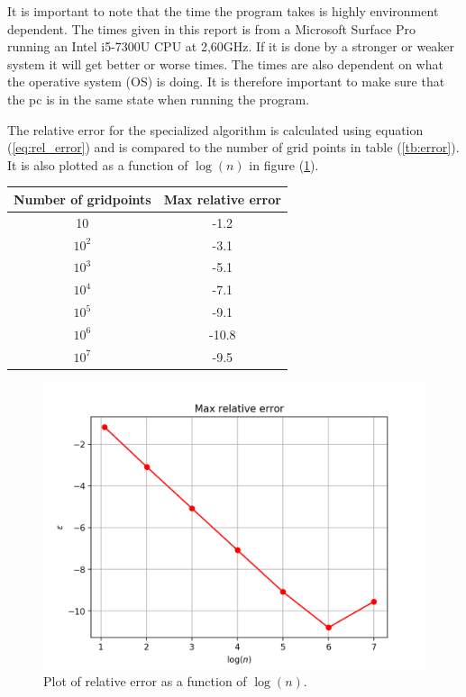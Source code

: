 \documentclass[12pt]{article}
\begin{document}
It is important to note that the time the program takes is highly environment dependent. The times given in this report is from a Microsoft Surface Pro running an Intel i5-7300U CPU at 2,60GHz. If it is done by a stronger or weaker system it will get better or worse times. The times are also dependent on what the operative system (OS) is doing. It is therefore important to make sure that the pc is in the same state when running the program.
\hfill\break

The relative error for the specialized algorithm is calculated using equation (\ref{eq:rel_error}) and is compared to the number of grid points in table (\ref{tb:error}). It is also plotted as a function of $\log{(n)}$ in figure (\ref{fig:rel_error}).


\begin{center}
  \label{tb:error}
  \begin{tabular}{||c|c||}

    \hline\hline Number of gridpoints & Max relative error \\
    \hline
    10 & -1.2 \\
    \hline
    $10^2$ & -3.1 \\
    \hline
    $10^3$ & -5.1 \\ 
    \hline
    $10^4$ & -7.1 \\
    \hline
    $10^5$ & -9.1 \\ 
    \hline
    $10^6$ & -10.8\\
    \hline
    $10^7$ & -9.5\\
    \hline\hline
    
  \end{tabular}
\end{center}

\begin{figure}[H]
  \centering  
  \includegraphics[scale=0.5]{relative_error.png}
  \caption{Plot of relative error as a function of $\log{(n)}$.}
  \label{fig:rel_error}
\end{figure}
\end{document}
